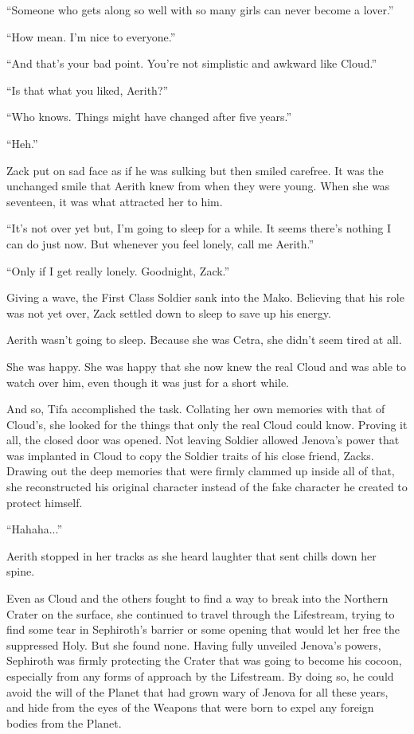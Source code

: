 \documentclass[oneside]{book}
\begin{document}
“Someone who gets along so well with so many girls can never become a lover.”

“How mean. I'm nice to everyone.”

“And that's your bad point. You're not simplistic and awkward like Cloud.”

“Is that what you liked, Aerith?”

“Who knows. Things might have changed after five years.”

“Heh.”

Zack put on sad face as if he was sulking but then smiled carefree. It was the unchanged smile that Aerith knew from when they were young. When she was seventeen, it was what attracted her to him.

“It's not over yet but, I'm going to sleep for a while. It seems there's nothing I can do just now. But whenever you feel lonely, call me Aerith.”

“Only if I get really lonely. Goodnight, Zack.”

Giving a wave, the First Class Soldier sank into the Mako. Believing that his role was not yet over, Zack settled down to sleep to save up his energy.

Aerith wasn't going to sleep. Because she was Cetra, she didn't seem tired at all.

She was happy. She was happy that she now knew the real Cloud and was able to watch over him, even though it was just for a short while.

And so, Tifa accomplished the task. Collating her own memories with that of Cloud's, she looked for the things that only the real Cloud could know. Proving it all, the closed door was opened. Not leaving Soldier allowed Jenova's power that was implanted in Cloud to copy the Soldier traits of his close friend, Zacks. Drawing out the deep memories that were firmly clammed up inside all of that, she reconstructed his original character instead of the fake character he created to protect himself.

\newpage
“Hahaha...”

Aerith stopped in her tracks as she heard laughter that sent chills down her spine.

Even as Cloud and the others fought to find a way to break into the Northern Crater on the surface, she continued to travel through the Lifestream, trying to find some tear in Sephiroth's barrier or some opening that would let her free the suppressed Holy. But she found none. Having fully unveiled Jenova's powers, Sephiroth was firmly protecting the Crater that was going to become his cocoon, especially from any forms of approach by the Lifestream. By doing so, he could avoid the will of the Planet that had grown wary of Jenova for all these years, and hide from the eyes of the Weapons that were born to expel any foreign bodies from the Planet.
\end{document}
